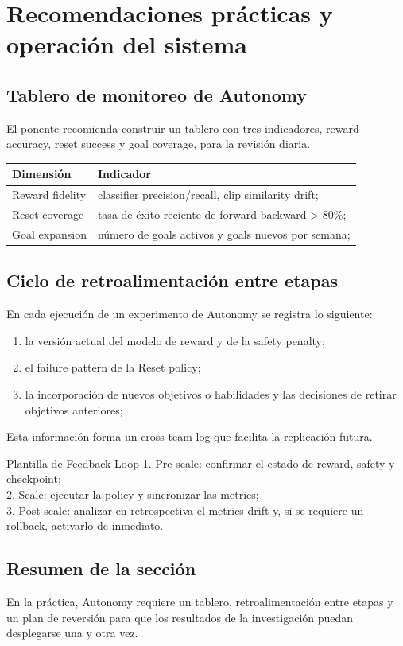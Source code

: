 \section{Recomendaciones prácticas y operación del sistema}
\subsection{Tablero de monitoreo de Autonomy}
El ponente recomienda construir un tablero con tres indicadores, reward accuracy, reset success y goal coverage, para la revisión diaria.
\begin{tabularx}{\textwidth}{lX}
\toprule
Dimensión & Indicador \\
\midrule
Reward fidelity & classifier precision/recall, clip similarity drift; \\
Reset coverage & tasa de éxito reciente de forward-backward > 80\%; \\
Goal expansion & número de goals activos y goals nuevos por semana; \\
\bottomrule
\end{tabularx}

\subsection{Ciclo de retroalimentación entre etapas}
En cada ejecución de un experimento de Autonomy se registra lo siguiente:
\begin{enumerate}
\item la versión actual del modelo de reward y de la safety penalty;
\item el failure pattern de la Reset policy;
\item la incorporación de nuevos objetivos o habilidades y las decisiones de retirar objetivos anteriores;
\end{enumerate}
Esta información forma un cross-team log que facilita la replicación futura.

\begin{knowledgebox}{Plantilla de Feedback Loop}
1. Pre-scale: confirmar el estado de reward, safety y checkpoint;\\
2. Scale: ejecutar la policy y sincronizar las metrics;\\
3. Post-scale: analizar en retrospectiva el metrics drift y, si se requiere un rollback, activarlo de inmediato.
\end{knowledgebox}

\subsection{Resumen de la sección}
En la práctica, Autonomy requiere un tablero, retroalimentación entre etapas y un plan de reversión para que los resultados de la investigación puedan desplegarse una y otra vez.
\newpage
